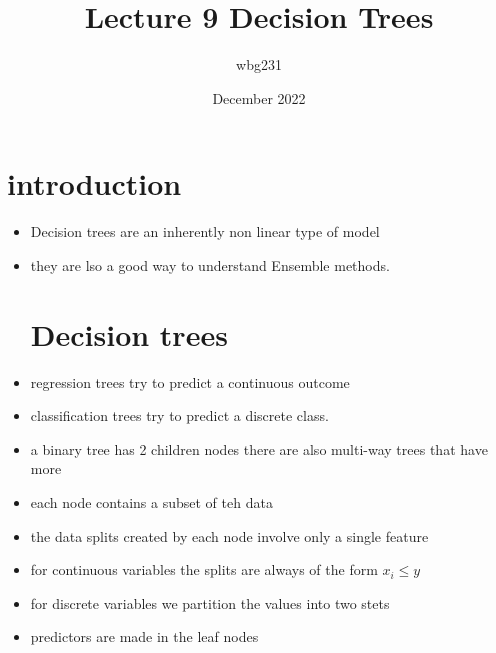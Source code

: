 \documentclass{article}
\title{Lecture 9 Decision  Trees}
\author{wbg231 }
\date{December 2022}
\begin{document}
\maketitle

\section*{introduction}
\begin{itemize}
\item Decision trees are an inherently non linear type of model
\item they are lso a good way to understand Ensemble  methods. 
\section*{Decision trees}
\item regression trees try to predict a continuous outcome 
\item classification trees try to predict a discrete class.
\item a binary tree has 2 children nodes there are also multi-way trees that have more 
\item each node contains a subset of teh data 
\item the data splits created by each node involve only a single feature 
\item for continuous variables the splits are always of the form $x_{i}\leq y$
\item for discrete variables we partition the values into two stets 
\item predictors are made in the leaf nodes 

\end{itemize}
\end{document}
